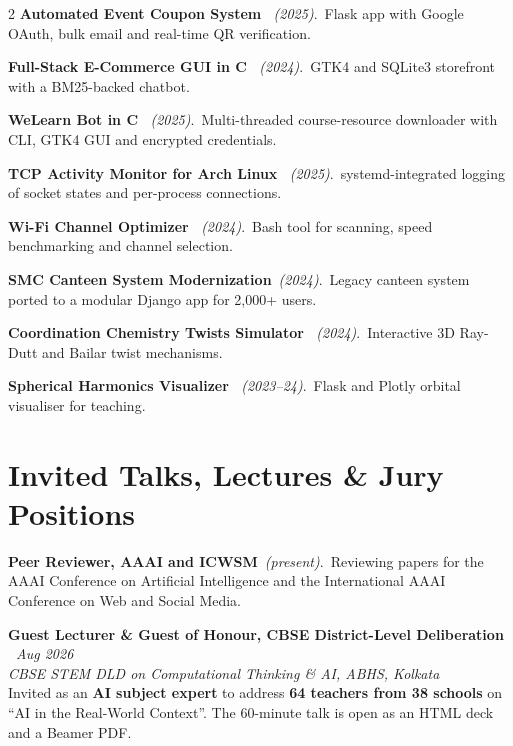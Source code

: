 \documentclass[a4paper,10.5pt]{extarticle}
\newcommand{\entryv}[4]{%
  {\normalsize\textbf{#1}}\hfill{\small\itshape\textcolor{mutedtext}{#2}}\\[0.04em]
  {\small\itshape\textcolor{mutedtext}{#3}}\\[0.04em]
  {\small #4}\par\vspace{3pt}%
}
\newcommand{\proj}[3]{{\small\textbf{#1}~{\itshape\textcolor{mutedtext}{(#2)}}.\ #3}\par\vspace{2.8pt}}
\begin{document}
\begin{paracol}{2}
\proj{Automated Event Coupon System \href{https://github.com/Shuvam-Banerji-Seal/Automated-Event-Coupon-Sender-Email-and-Verification-Application}{\faGithub}}{2025}{Flask app with Google OAuth, bulk email and real-time QR verification.}

\proj{Full-Stack E-Commerce GUI in C \href{https://github.com/Shuvam-Banerji-Seal/CS3101-E-Commerce-App-in-C.git}{\faGithub}}{2024}{GTK4 and SQLite3 storefront with a BM25-backed chatbot.}

\proj{WeLearn Bot in C \href{https://github.com/Shuvam-Banerji-Seal/welearnbot_in_C}{\faGithub}}{2025}{Multi-threaded course-resource downloader with CLI, GTK4 GUI and encrypted credentials.}

\proj{TCP Activity Monitor for Arch Linux \href{https://github.com/Shuvam-Banerji-Seal/TCP-Count-Monitor-for-Arch-Linux}{\faGithub}}{2025}{systemd-integrated logging of socket states and per-process connections.}

\proj{Wi-Fi Channel Optimizer \href{https://github.com/Shuvam-Banerji-Seal/Wi-Fi-channel-optimizer}{\faGithub}}{2024}{Bash tool for scanning, speed benchmarking and channel selection.}

\proj{SMC Canteen System Modernization}{2024}{Legacy canteen system ported to a modular Django app for 2,000+ users.}

\proj{Coordination Chemistry Twists Simulator \href{https://github.com/Shuvam-Banerji-Seal/Ray-Dutt-and-Bailar-Twists-Simulator}{\faGithub}}{2024}{Interactive 3D Ray-Dutt and Bailar twist mechanisms.}

\proj{Spherical Harmonics Visualizer \href{https://github.com/Shuvam-Banerji-Seal/simple-spherical-harmonics-visualizer}{\faGithub}}{2023--24}{Flask and Plotly orbital visualiser for teaching.}

\switchcolumn

\section{Invited Talks, Lectures \& Jury Positions}

\proj{Peer Reviewer, AAAI and ICWSM}{present}{Reviewing papers for the AAAI Conference on Artificial Intelligence and the International AAAI Conference on Web and Social Media.}

\entryv{Guest Lecturer \& Guest of Honour, CBSE District-Level Deliberation \href{https://shuvam-banerji-seal.github.io/ai-in-real-world-context/}{\faGlobe}~\href{https://github.com/Shuvam-Banerji-Seal/ai-in-real-world-context}{\faGithub}}{Aug 2026}{CBSE STEM DLD on Computational Thinking \& AI, ABHS, Kolkata}{%
Invited as an \textbf{AI subject expert} to address \textbf{64 teachers from 38 schools} on ``AI in the Real-World Context''. The 60-minute talk is open as an HTML deck and a Beamer PDF.}


\end{paracol}
\end{document}
